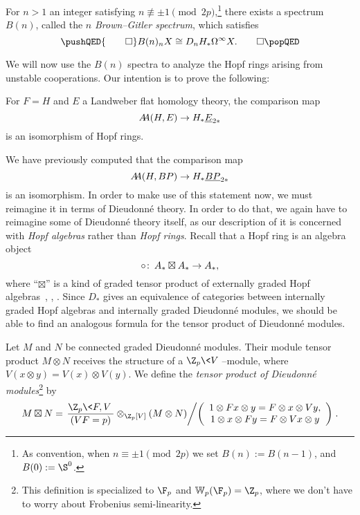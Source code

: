 \begin{corollary}\label{BrownGitlerSpectraDefn}
For \(n > 1\) an integer satisfying \(n \not\equiv \pm 1 \pmod{2p}\),\footnote{As convention, when \(n \equiv \pm 1 \pmod{2p}\) we set \(B(n) := B(n-1)\), and \(B(0) := \S^0\).} there exists a spectrum \(B(n)\), called the \(n\){\th} \textit{Brown--Gitler spectrum}, which satisfies \[\pushQED{\qed}B(n)_n X \cong D_n H_* \Loops^\infty X. \qedhere\popQED\]
\end{corollary}


We will now use the \(B(n)\) spectra to analyze the Hopf rings arising from unstable cooperations.  Our intention is to prove the following:
\begin{theorem}\label{LEFTUnstableCooperations}
For \(F = H\) and \(E\) a Landweber flat homology theory, the comparison map \[\AA(H, E) \to H_* \OS{E}{2*}\] is an isomorphism of Hopf rings.
\end{theorem}
\noindent We have previously computed that the comparison map \[\AA(H, BP) \to H_* \OS{BP}{2*}\] is an isomorphism.  In order to make use of this statement now, we must reimagine it in terms of Dieudonn\'e theory.  In order to do that, we again have to reimagine some of Dieudonn\'e theory itself, as our description of it is concerned with \emph{Hopf algebras} rather than \emph{Hopf rings}.  Recall that a Hopf ring is an algebra object \[\circ\colon\thinspace A_* \boxtimes A_* \to A_*,\] where ``\(\boxtimes\)'' is a kind of graded tensor product of externally graded Hopf algebras~\cite[Proposition 2.6]{HuntonTurner}, \cite[Definition 2.2]{BuchstaberLazarev}, \cite[Section 5]{GoerssDieudonne}.  Since \(D_*\) gives an equivalence of categories between internally graded Hopf algebras and internally graded Dieudonn\'e modules, we should be able to find an analogous formula for the tensor product of Dieudonn\'e modules.

\begin{definition}{\cite[pg.\ 154]{GoerssDieudonne}}
Let \(M\) and \(N\) be connected graded Dieudonn\'e modules.  Their module tensor product \(M \otimes N\) receives the structure of a \(\Z_p\<V\>\)--module, where \(V(x \otimes y) = V(x) \otimes V(y)\).  We define the \textit{tensor product of Dieudonn\'e modules}\footnote{This definition is specialized to \(\F_p\) and \(\mathbb W_p(\F_p) = \Z_p\), where we don't have to worry about Frobenius semi-linearity.} by \[M \boxtimes N = \left.\frac{\Z_p\<F, V\>}{(VF = p)} \otimes_{\Z_p[V]} (M \otimes N) \middle/ \left( \begin{array}{c} 1 \otimes Fx \otimes y = F \otimes x \otimes Vy, \\ 1 \otimes x \otimes Fy = F \otimes Vx \otimes y \end{array} \right) \right. .\]
\end{definition}

